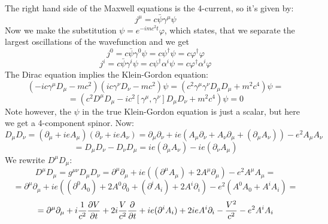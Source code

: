 The right hand side of the Maxwell equations is the 4-current, so it's given by: 
\begin{equation*}
  j^\mu=c\bar\psi\gamma^\mu\psi
\end{equation*}
Now we make the substitution $\psi=e^{-imc^2t}\varphi$, which states, that we separate the largest oscillations of the wavefunction and we get 
\begin{equation*}
  j^0=c\bar\psi\gamma^0\psi=c\psi^\dagger\psi=c\varphi^\dagger\varphi
\end{equation*}
\begin{equation*}
  j^i=c\bar\psi\gamma^i\psi=c\psi^\dagger\alpha^i\psi=c\varphi^\dagger\alpha^i\varphi
\end{equation*}
The Dirac equation implies the Klein-Gordon equation: 
\begin{equation*}
  (-ic\gamma^\mu D_\mu-mc^2)(ic\gamma^\nu D_\nu-mc^2)\psi= (c^2\gamma^\mu\gamma^\nu D_\mu D_\mu+m^2c^4)\psi=
\end{equation*}
\begin{equation*}
  =(c^2D^\mu D_\mu-ic^2[\gamma^\mu,\gamma^\nu]D_\mu D_\nu+m^2c^4)\psi=0
\end{equation*}
Note however, the $\psi$ in the true Klein-Gordon equation is just a scalar, but here we get a 4-component spinor. Now: 
\begin{equation*}
  D_\mu D_\nu = (\partial_\mu+ieA_\mu)(\partial_\nu+ieA_\nu)= \partial_\mu\partial_\nu+ie(A_\mu\partial_\nu+A_\nu\partial_\mu+ (\partial_\mu A_\nu))-e^2A_\mu A_\nu
\end{equation*}
\begin{equation*}
  [D_\mu, D_\nu] = D_\mu D_\nu-D_\nu D_\mu=ie(\partial_\mu A_\nu)- ie(\partial_\nu A_\mu)
\end{equation*}
We rewrite $D^\mu D_\mu$: 
\begin{equation*}
  D^\mu D_\mu=g^{\mu\nu}D_\mu D_\nu= \partial^\mu\partial_\mu+ie((\partial^\mu A_\mu)+2A^\mu\partial_\mu) -e^2A^\mu A_\mu=
\end{equation*}
\begin{equation*}
  =\partial^\mu\partial_\mu+ ie((\partial^0 A_0)+2A^0\partial_0+(\partial^i A_i)+2A^i\partial_i) -e^2(A^0A_0+A^i A_i)=
\end{equation*}
\begin{equation*}
  =\partial^\mu\partial_\mu +i{1\over c^2}{\partial V\over\partial t}+ 2i{V\over c^2}{\partial\over\partial t} +ie(\partial^i A_i)+2ieA^i\partial_i -{V^2\over c^2}-e^2A^iA_i
\end{equation*}

